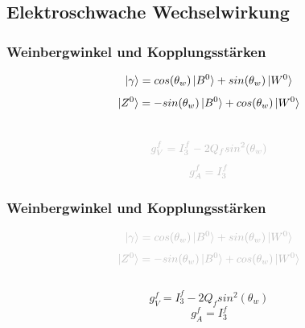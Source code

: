 \subsection{Elektroschwache Wechselwirkung}
\begin{frame}
	\frametitle{Weinbergwinkel und Kopplungsstärken}
	\begin{center}
		\begin{equation*}
			\ket{\gamma} =  cos(\theta_w)\ket{B^0} + sin(\theta_w) \ket{W^0}
		\end{equation*}
		\begin{equation*}
		\ket{Z^0} = -sin(\theta_w) \ket{B^0} + cos(\theta_w) \ket{W^0}
		\end{equation*}\\
		\begin{equation*}
		\textcolor{lightgray}{g_V^f = I^f_3-2 Q_f sin^2(\theta_w)}
		\end{equation*}
		\begin{equation*}
		\textcolor{lightgray}{g_A^f = I^f_3}
		\end{equation*}
	\end{center}
\end{frame}
\begin{frame}
	\frametitle{Weinbergwinkel und Kopplungsstärken}
	\begin{center}
		\begin{equation*}
		\textcolor{lightgray}{\ket{\gamma} =  cos(\theta_w)\ket{B^0} + sin(\theta_w) \ket{W^0}}
		\end{equation*}
		\begin{equation*}
		\textcolor{lightgray}{\ket{Z^0} = -sin(\theta_w) \ket{B^0} + cos(\theta_w) \ket{W^0}}
		\end{equation*}
		\\
		\begin{equation*}
			g_V^f = I^f_3-2 Q_f sin^2(\theta_w)
		\end{equation*}
		\begin{equation*}
			g_A^f = I^f_3
		\end{equation*}
	\end{center}
\end{frame}

